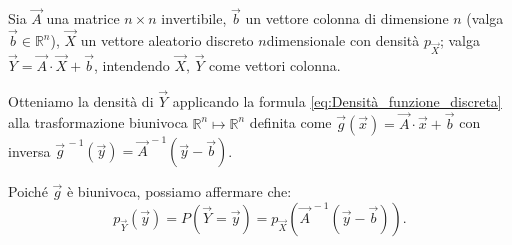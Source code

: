         \begin{defn}
            Sia $\vec{A}$ una matrice $n \times n$ invertibile, $\vec{b}$ un vettore colonna di dimensione $n$ (valga $\vec{b} \in \mathbb{R}^n$), $\vec{X}$ un vettore aleatorio discreto $n$\nbdash dimensionale con densità $p_{\vec{X}}$; valga $\vec{Y} = \vec{A} \cdot \vec{X} + \vec{b}$, intendendo $\vec{X},\, \vec{Y}$ come vettori colonna.

            Otteniamo la densità di $\vec{Y}$ applicando la formula \eqref{eq:Densità_funzione_discreta} alla trasformazione biunivoca $\mathbb{R}^n \mapsto \mathbb{R}^n$ definita come $\vec{g}(\vec{x}) = \vec{A} \cdot \vec{x} + \vec{b}$ con inversa $\vec{g}^{\,-1}(\vec{y}) = \vec{A}^{\,-1}(\vec{y} - \vec{b})$.

            Poiché $\vec{g}$ è biunivoca, possiamo affermare che:
            \begin{equation}\label{eq:Trasformazioni_vettori_discreti}
                p_{\vec{Y}}(\vec{y}) = P(\vec{Y} = \vec{y}) = p_{\vec{X}}(\vec{A}^{\,-1}(\vec{y} - \vec{b}))
            .\end{equation}
        \end{defn}
